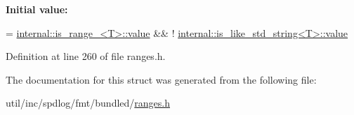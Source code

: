 {\bfseries Initial value\+:}
\begin{DoxyCode}
=
    \hyperlink{structinternal_1_1is__range__}{internal::is\_range\_<T>::value} && !
      \hyperlink{classinternal_1_1is__like__std__string}{internal::is\_like\_std\_string<T>::value}
\end{DoxyCode}


Definition at line 260 of file ranges.\+h.



The documentation for this struct was generated from the following file\+:\begin{DoxyCompactItemize}
\item 
util/inc/spdlog/fmt/bundled/\hyperlink{ranges_8h}{ranges.\+h}\end{DoxyCompactItemize}
